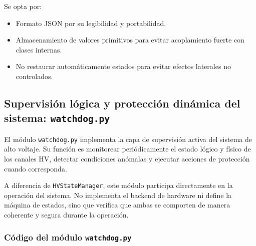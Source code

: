 \documentclass{article}
\begin{document}
Se opta por:
\begin{itemize}
    \item Formato JSON por su legibilidad y portabilidad.
    \item Almacenamiento de valores primitivos para evitar acoplamiento fuerte con clases internas.
    \item No restaurar automáticamente estados para evitar efectos laterales no controlados.
\end{itemize}



\subsection{Supervisión lógica y protección dinámica del sistema: \texttt{watchdog.py}}

El módulo \texttt{watchdog.py} implementa la capa de supervisión activa del sistema
de alto voltaje. Su función es monitorear periódicamente el estado lógico y físico
de los canales HV, detectar condiciones anómalas y ejecutar acciones de protección
cuando corresponda.

A diferencia de \texttt{HVStateManager}, este módulo participa directamente en la
operación del sistema. No implementa el backend de hardware ni define la máquina
de estados, sino que verifica que ambas se comporten de manera coherente y segura
durante la operación.

\subsubsection{Código del módulo \texttt{watchdog.py}}
\end{document}
